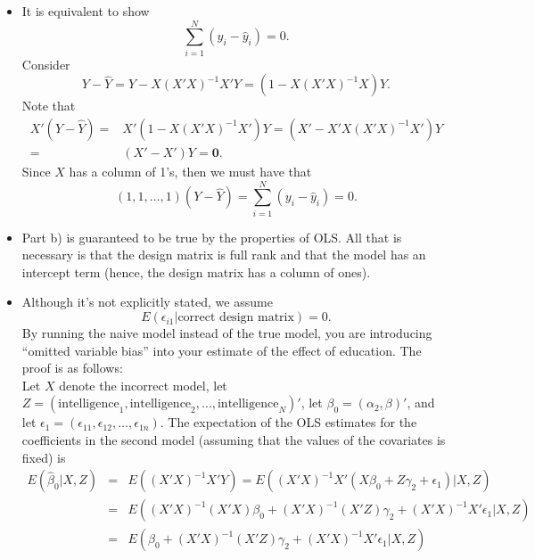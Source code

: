 \documentclass{article}
\begin{document}
\begin{itemize}
\begin{itemize}
$$\begin{array}{cc}
            1 & \text{education level}_2  \\
            \vdots & \vdots  \\
            1 & \text{education level}_N 
          \end{array}
        \right ).
      $$
    \item[b)]
      \label{partb}
      It is equivalent to show
      $$
        \sum_{i=1}^N (y_i - \hat y_i) = 0.
      $$
      Consider 
      $$
        Y - \hat Y = Y - X(X'X)^{-1}X'Y = (1 - X(X'X)^{-1}X)Y.
      $$
      Note that 
      \begin{align*}
        X'(Y - \hat Y) = & X'(1 - X(X'X)^{-1}X')Y = (X' - X'X(X'X)^{-1}X')Y \\
        = & (X' - X')Y = \mathbf 0.
      \end{align*}
      Since $X$ has a column of 1's, then we must have that
      \begin{equation*}
        (1, 1, \ldots, 1)(Y - \hat Y) = \sum_{i=1}^N (y_i - \hat y_i) = 0.
      \end{equation*}
    \item[c)]
      Part b) is guaranteed to be true by the properties of OLS.
      All that is necessary is that the design matrix is full rank 
      and that the model has an intercept term (hence, the design matrix has a column of ones).
    \item[d,e)]
      Although it's not explicitly stated, we assume
      $$
        E(\epsilon_{i1}| \text{correct design matrix}) = 0.
      $$
      By running the naive model instead of the true model, 
      you are introducing ``omitted variable bias'' into your 
      estimate of the effect of education. 
      The proof is as follows: \\[1ex]
      Let $X$ denote the incorrect model, 
      let $Z = (\text{intelligence}_1,  \text{intelligence}_2,\ldots, \text{intelligence}_N)'$,
      let $\beta_0 = (\alpha_2,\beta)'$, and let $\epsilon_1 = (\epsilon_{11},\epsilon_{12}, \ldots, \epsilon_{1n})$.
      The expectation of the OLS estimates for the coefficients in the second model 
      (assuming that the values of the covariates is fixed) is 
      \begin{eqnarray*}
        E(\hat \beta_0|X,Z) &=& E((X'X)^{-1}X'Y) = E((X'X)^{-1}X'(X\beta_0 + Z\gamma_2 + \epsilon_{1})|X,Z)\\
        &=& E((X'X)^{-1}(X'X)\beta_0 + (X'X)^{-1}(X'Z)\gamma_2 + (X'X)^{-1}X'\epsilon_{1}|X,Z)\\
        & = & E(\beta_0 +  (X'X)^{-1}(X'Z)\gamma_2 + (X'X)^{-1}X'\epsilon_{1}|X,Z) \\

\end{eqnarray*}
\end{itemize}
\end{itemize}
\end{document}
